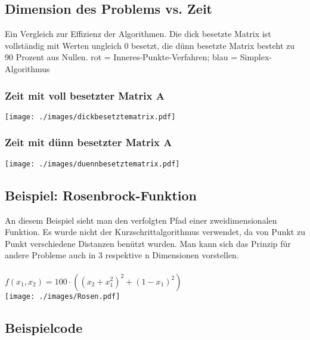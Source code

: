 \subsection{Dimension des Problems vs. Zeit}
Ein Vergleich zur Effizienz der Algorithmen. Die dick besetzte Matrix ist vollständig mit Werten ungleich 0 besetzt, die dünn besetzte Matrix besteht zu 90 Prozent aus Nullen. rot = Inneres-Punkte-Verfahren; blau = Simplex-Algorithmus
\begin{minipage}[t]{9.0cm}
  \subsubsection{Zeit mit voll besetzter Matrix A}
  \texttt{[image: ./images/dickbesetztematrix.pdf]}
\end{minipage}
\hspace{0.1cm}
\begin{minipage}[t]{9.0cm}	
	\subsubsection{Zeit mit dünn besetzter Matrix A}
	\texttt{[image: ./images/duennbesetztematrix.pdf]}
\end{minipage}



\subsection{Beispiel: Rosenbrock-Funktion}
An diesem Beispiel sieht man den verfolgten Pfad einer zweidimensionalen Funktion. Es wurde nicht der Kurzschrittalgorithmus verwendet, da von Punkt zu Punkt verschiedene Distanzen benützt wurden. Man kann sich das Prinzip für andere Probleme auch in 3 respektive n Dimensionen vorstellen.\\
 \\
$f(x_1, x_2) = 100 \cdot ((x_2+x_1^2)^2 + (1-x_1)^2)$\\
\texttt{[image: ./images/Rosen.pdf]}




\newpage

\subsection{Beispielcode}
